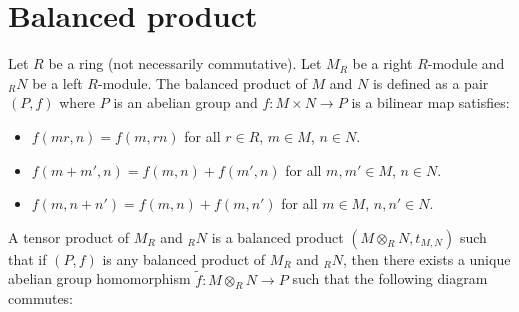 \section{Balanced product}

\begin{definition}
    Let $R$ be a ring (not necessarily commutative). Let $M_R$ be a right $R$-module and $_{R}N$ be a left $R$-module. The balanced product of $M$ and $N$ is defined as a pair $(P,f)$ where $P$ is an abelian group and $f: M \times N \to P$ is a bilinear map satisfies:
    \begin{itemize}
        \item $f(mr,n) = f(m,rn)$ for all $r \in R$, $m \in M$, $n \in N$.
        \item $f(m+m',n) = f(m,n) + f(m',n)$ for all $m,m' \in M$, $n \in N$.
        \item $f(m,n+n') = f(m,n) + f(m,n')$ for all $m \in M$, $n,n' \in N$.
    \end{itemize}
\end{definition}


\begin{definition}
    A tensor product of $M_R$ and $_{R}N$ is a balanced product $(M \otimes_R N,t_{M,N})$ such that if $(P,f)$ is any balanced product of $M_R$ and $_{R}N$, then there exists a unique abelian group homomorphism $\tilde{f}: M \otimes_R N \to P$ such that the following diagram commutes:
    \begin{center}
    \end{center}
\end{definition}

